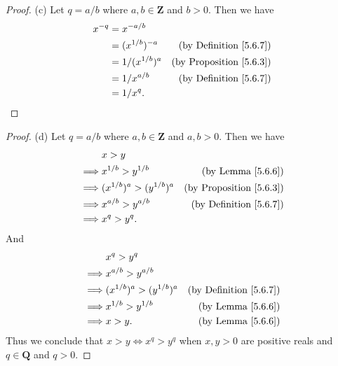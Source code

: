 \begin{proof}{(c)}
    Let \(q = a / b\) where \(a, b \in \mathbf{Z}\) and \(b > 0\).
    Then we have
    \begin{align*}
        x^{-q} & = x^{-a / b}                                              \\
               & = (x^{1 / b})^{-a}  & \text{(by Definition \ref{5.6.7})}  \\
               & = 1 / (x^{1 / b})^a & \text{(by Proposition \ref{5.6.3})} \\
               & = 1 / x^{a / b}     & \text{(by Definition \ref{5.6.7})}  \\
               & = 1 / x^q.
    \end{align*}
\end{proof}

\begin{proof}{(d)}
    Let \(q = a / b\) where \(a, b \in \mathbf{Z}\) and \(a, b > 0\).
    Then we have
    \begin{align*}
                 & x > y                                                               \\
        \implies & x^{1 / b} > y^{1 / b}         & \text{(by Lemma \ref{5.6.6})}       \\
        \implies & (x^{1 / b})^a > (y^{1 / b})^a & \text{(by Proposition \ref{5.6.3})} \\
        \implies & x^{a / b} > y^{a / b}         & \text{(by Definition \ref{5.6.7})}  \\
        \implies & x^q > y^q.
    \end{align*}
    And
    \begin{align*}
                 & x^q > y^q                                                          \\
        \implies & x^{a / b} > y^{a / b}                                              \\
        \implies & (x^{1 / b})^a > (y^{1 / b})^a & \text{(by Definition \ref{5.6.7})} \\
        \implies & x^{1 / b} > y^{1 / b}         & \text{(by Lemma \ref{5.6.6})}      \\
        \implies & x > y.                        & \text{(by Lemma \ref{5.6.6})}
    \end{align*}
    Thus we conclude that \(x > y \iff x^q > y^q\) when \(x, y > 0\) are positive reals and \(q \in \mathbf{Q}\) and \(q > 0\).
\end{proof}

